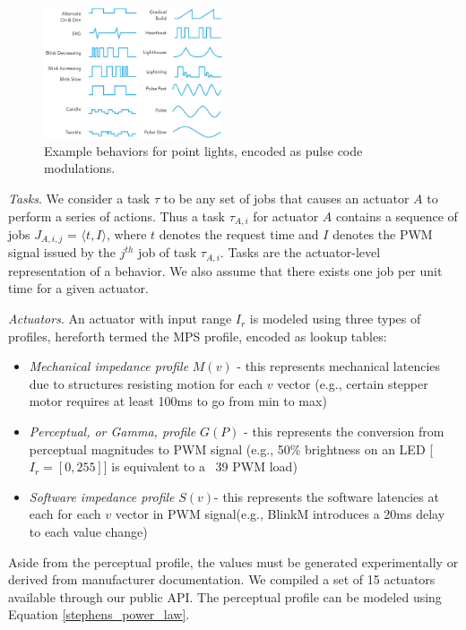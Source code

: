 \documentclass{sigchi}
\begin{document}
  \begin{figure}[t]
      \centering
      \includegraphics[keepaspectratio, width=0.47\textwidth]{figures/behaviors.pdf}
      \caption{ Example behaviors for point lights, encoded as pulse code modulations. }
        \label{fig:behaviors} 
    \end{figure}

  \textit{Tasks}. We consider a  task $\tau$ to be any set of jobs that causes an actuator $A$ to perform a series of actions.  Thus a  task $\tau_{A, i}$ for actuator $A$ contains a sequence of jobs $J_{A,i,j}$ = $\langle t, I \rangle$, where $t$ denotes the request time and $I$ denotes the PWM signal issued by the $j^{th}$ job of task $\tau_{A, i}$. Tasks are the actuator-level representation of a behavior. We also assume that there exists one job per unit time for a given actuator.

  \textit{Actuators}.
  An actuator with input range $I_r$ is modeled using three types of profiles, hereforth termed the MPS profile, encoded as lookup tables:
  \begin{itemize}
      \item \textit{Mechanical impedance profile} $M(v)$ - this represents mechanical latencies due to structures resisting motion for each $v$ vector (e.g., certain stepper motor requires at least 100ms to go from min to max) 
      \item \textit{Perceptual, or Gamma, profile} $G(P)$ - this represents the conversion from  perceptual magnitudes to PWM signal (e.g., 50\% brightness on an LED [$I_r = [0, 255]$] is equivalent to a ~39 PWM load)
      \item \textit{Software impedance profile} $S(v)$- this represents the software latencies at each for each $v$ vector in PWM signal(e.g., BlinkM introduces a 20ms delay to each  value change) 
    \end{itemize}
    Aside from the perceptual profile, the values must be generated experimentally or derived from manufacturer documentation. We compiled a set of 15 actuators available through our public API. The perceptual profile can be modeled using Equation \ref{stephens_power_law}. 
\end{document}
